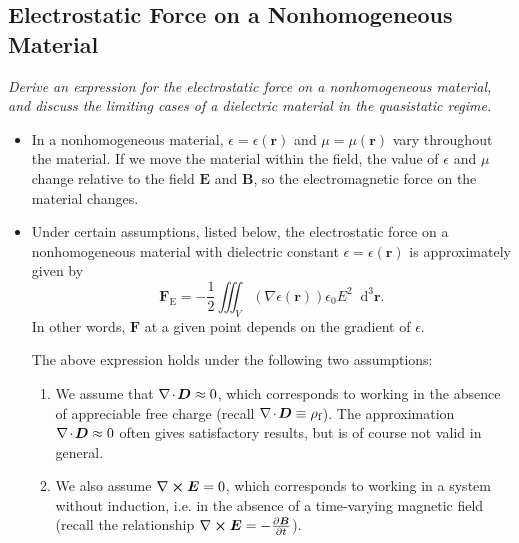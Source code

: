 \documentclass[11pt, a4paper]{article}
\newcommand{\diff}{\mathop{}\!\mathrm{d}} %
\newcommand{\dr}{\diff^{3} \r}  %
\renewcommand{\vec}[1]{\bm{#1}} %
\renewcommand{\r}{\vec{r}}
\newcommand{\E}{\vec{E}} %
\newcommand{\D}{\vec{D}}  %
\newcommand{\B}{\vec{B}} %
\newcommand{\e}{\epsilon}
\newcommand{\ee}{\epsilon_{0}}  %
\renewcommand{\div}{\nabla \mspace{-2mu} \cdot \mspace{-2mu}}
\renewcommand{\curl}{\nabla \cross}
\renewcommand{\grad}{\nabla}
\begin{document}
\subsection{Electrostatic Force on a Nonhomogeneous Material}
\textit{Derive an expression for the electrostatic force on a nonhomogeneous material, and discuss the limiting cases of a dielectric material in the quasistatic regime.}
\begin{itemize}
	\item In a nonhomogeneous material, $ \e = \e(\r) $ and $ \mu = \mu(\r) $ vary throughout the material. If we move the material within the field, the value of $ \e $ and $ \mu $ change relative to the field $ \E $ and $ \B $, so the electromagnetic force on the material changes. 

    \item Under certain assumptions, listed below, the electrostatic force on a nonhomogeneous material with dielectric constant $ \epsilon = \epsilon(\r) $ is approximately given by
	\begin{equation*}
		\vec{F}_{\text{E}} = - \frac{1}{2}\iiint_{V}(\grad \e(\r))\ee E^{2}\dr.
	\end{equation*}
	In other words, $ \vec{F} $ at a given point depends on the gradient of $ \e $. 

    The above expression holds under the following two assumptions:
    \begin{enumerate}
        \item We assume that $ \div \D \approx 0 $, which corresponds to working in the absence of appreciable free charge (recall $ \div \D \equiv \rho_{\text{f}} $). The approximation $ \div \D \approx 0 $ often gives satisfactory results, but is of course not valid in general.
        
        \item We also assume $ \curl \E = 0 $, which corresponds to working in a system without induction, i.e. in the absence of a time-varying magnetic field (recall the relationship $ \curl \E = - \pdv{\B}{t} $).
    \end{enumerate}

\end{itemize}
\end{document}
